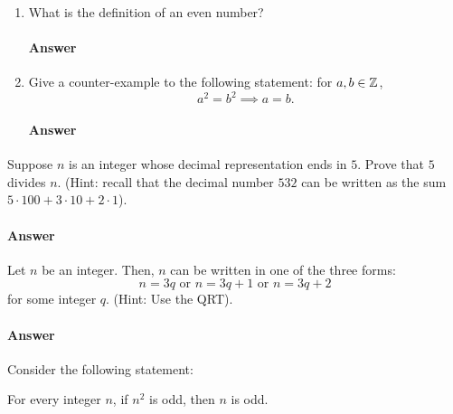 \begin{enumerate}
    \item What is the definition of an even number?
        \paragraph{Answer}
        \todo{}

    \item Give a counter-example to the following statement: for $a,b \in {\mathbb Z}$,
        $$a^2=b^2 \implies a=b.$$
        \paragraph{Answer}
        \todo{}

\end{enumerate}

\collab{\todo{}}

Suppose $n$ is an integer whose decimal representation ends in $5$.  Prove that
$5$ divides $n$. (Hint: recall that the decimal number $532$ can be written as
the sum $5\cdot 100 + 3 \cdot 10 + 2 \cdot 1$).

\paragraph{Answer}
\todo{}

\collab{\todo{}}

Let $n$ be an integer.  Then, $n$ can be written in one of the three forms:
$$
    n=3q
    \text{ or }
    n=3q+1
    \text{ or }
    n=3q+2
$$
for some integer $q$. (Hint: Use the QRT).

\paragraph{Answer}
\todo{}

\collab{\todo{}}

Consider the following statement:

For every integer $n$, if $n^2$ is odd, then
$n$ is odd.

